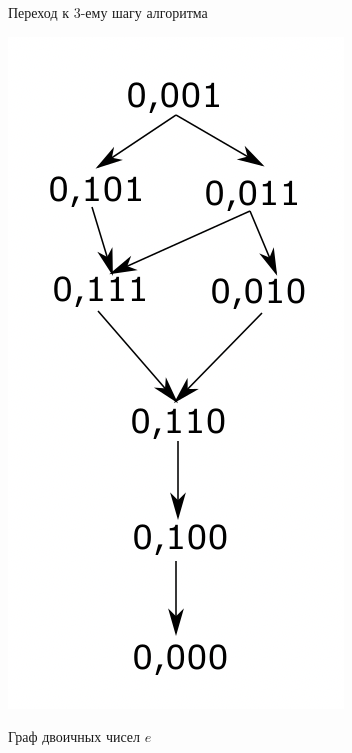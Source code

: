 \documentclass[russian, unicode, mathserif, aspectratio=169]{beamer}
\begin{document}
\begin{frame}{Переход к 3-ему шагу алгоритма}
\begin{minipage}{0.2\textwidth}
{		\includegraphics[width=\textwidth]{pictures/image_22b.png}
		\caption{Граф двоичных чисел $e$}
		}
	\end{minipage}
\end{frame}
\end{document}
